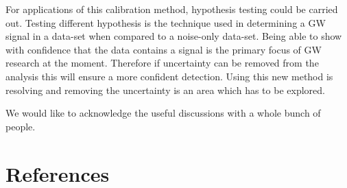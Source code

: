 \documentclass[12pt]{iopart}
\begin{document}
For applications of this calibration method, hypothesis testing could be
carried out. Testing different hypothesis is the technique used in determining
a GW signal in a data-set when compared to a noise-only data-set. Being able to
show with confidence that the data contains a signal is the primary focus of GW
research at the moment. Therefore if uncertainty can be removed from the
analysis this will ensure a more confident detection. Using this new method is
resolving and removing the uncertainty is an area which has to be explored.

\ack

We would like to acknowledge the useful discussions with a whole bunch
of people.

\section*{References}



\end{document}
